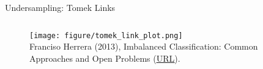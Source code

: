\documentclass[11pt,compress,t,notes=noshow, xcolor=table]{beamer}
\begin{document}
\begin{frame}{Undersampling: Tomek Links}
{\begin{columns}
            \begin{column}{0.4\textwidth}
                \begin{figure}
                    \centering
                    \texttt{[image: figure/tomek\_link\_plot.png]}	
                    \tiny
                    \\ Franciso Herrera (2013), Imbalanced Classification: Common
                    Approaches and Open Problems (\href{https://sci2s.ugr.es/sites/default/files/files/TutorialsAndPlenaryTalks/SSTiC-Trends in-Classification-Imbalanced-data-sets.pdf}{\underline{URL}}).
                \end{figure}
            \end{column}
        \end{columns}
	   }
	\end{frame}
\end{document}
